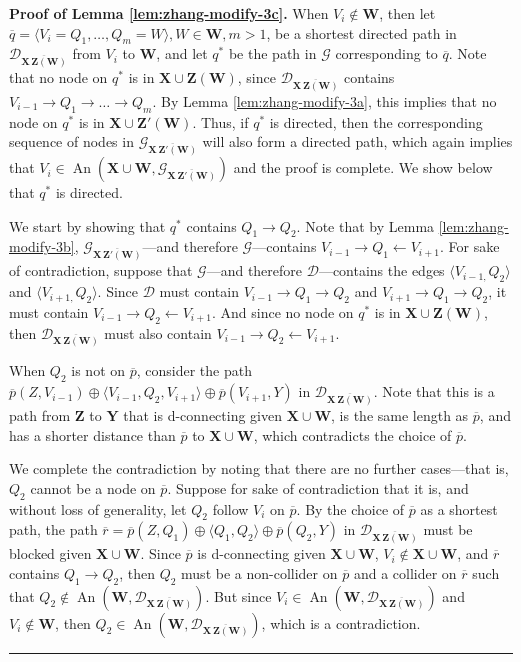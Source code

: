 \documentclass[11pt]{article}
\DeclareMathOperator{\An}{An}
\newcommand{\BlackBox}{\rule{1.5ex}{1.5ex}}  %
\newcommand{\mb}[1]{\mathbf{#1}}
\newcommand{\g}[1][G]{\mathcal{#1}}
\newenvironment{proofof}[1][]{\noindent \textbf{Proof of #1.}}{\hfill\BlackBox}
\begin{document}
\begin{proofof}[Lemma \ref{lem:zhang-modify-3c}]
    When $V_i \notin \mb{W}$, then let $\overline{q} = \langle V_i=Q_1, \dots, Q_m=W \rangle, W \in \mb{W}, m > 1$, be a shortest directed path in $\g[D]_{\overline{\mb{X \, Z(W)}}}$ from $V_i$ to $\mb{W}$, and let $q^*$ be the path in $\g$ corresponding to $\overline{q}$. Note that no node on $q^*$ is in $\mb{X} \cup \mb{Z(W)}$, since $\g[D]_{\overline{\mb{X \, Z(W)}}}$ contains $V_{i-1} \to Q_1 \to \dots \to Q_m$. By Lemma \ref{lem:zhang-modify-3a}, this implies that no node on $q^*$ is in $\mb{X} \cup \mb{Z'(W)}$. Thus, if $q^*$ is directed, then the corresponding sequence of nodes in $\g_{\overline{\mb{X \, Z'(W)}}}$ will also form a directed path, which again implies that $V_i \in \An(\mb{X} \cup \mb{W}, \g_{\overline{\mb{X \, Z'(W)}}})$ and the proof is complete. We show below that $q^*$ is directed.

    We start by showing that $q^*$ contains $Q_1 \to Q_2$. Note that by Lemma \ref{lem:zhang-modify-3b}, $\g_{\overline{\mb{X \, Z'(W)}}}$---and therefore $\g$---contains $V_{i-1} \to Q_1 \gets V_{i+1}$. For sake of contradiction, suppose that $\g$---and therefore $\g[D]$---contains the edges $\langle V_{i-1,} Q_2 \rangle$ and $\langle V_{i+1,} Q_2 \rangle$. Since $\g[D]$ must contain $V_{i-1} \to Q_1 \to Q_2$ and $V_{i+1} \to Q_1 \to Q_2$, it must contain $V_{i-1} \to Q_2 \gets V_{i+1}$. And since no node on $q^*$ is in $\mb{X} \cup \mb{Z(W)}$, then $\g[D]_{\overline{\mb{X \, Z(W)}}}$ must also contain $V_{i-1} \to Q_2 \gets V_{i+1}$.

    When $Q_2$ is not on $\overline{p}$, consider the path $\overline{p}(Z, V_{i-1}) \oplus \langle V_{i-1}, Q_2, V_{i+1} \rangle \oplus \overline{p}(V_{i+1}, Y)$ in $\g[D]_{\overline{\mb{X \, Z(W)}}}$. Note that this is a path from $\mb{Z}$ to $\mb{Y}$ that is d-connecting given $\mb{X} \cup \mb{W}$, is the same length as $\overline{p}$, and has a shorter distance than $\overline{p}$ to $\mb{X} \cup \mb{W}$, which contradicts the choice of $\overline{p}$. 

    We complete the contradiction by noting that there are no further cases---that is, $Q_2$ cannot be a node on $\overline{p}$. Suppose for sake of contradiction that it is, and without loss of generality, let $Q_2$ follow $V_i$ on $\overline{p}$. By the choice of $\overline{p}$ as a shortest path, the path $\overline{r} = \overline{p}(Z, Q_1) \oplus \langle Q_1, Q_2 \rangle \oplus \overline{p}(Q_2, Y)$ in $\g[D]_{\overline{\mb{X \, Z(W)}}}$ must be blocked given $\mb{X} \cup \mb{W}$. Since $\overline{p}$ is d-connecting given $\mb{X} \cup \mb{W}$, $V_i \notin \mb{X} \cup \mb{W}$, and $\overline{r}$ contains $Q_1 \to Q_2$, then $Q_2$ must be a non-collider on $\overline{p}$ and a collider on $\overline{r}$ such that $Q_2 \notin \An(\mb{W}, \g[D]_{\overline{\mb{X \, Z(W)}}})$. But since $V_i \in \An(\mb{W}, \g[D]_{\overline{\mb{X \, Z(W)}}})$ and $V_i \notin \mb{W}$, then $Q_2 \in \An(\mb{W}, \g[D]_{\overline{\mb{X \, Z(W)}}})$, which is a contradiction.


\end{proofof}
\end{document}

